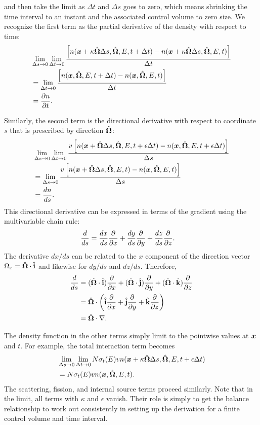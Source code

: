  and then take the limit as $\Delta t$ and $\Delta s$ goes to zero, which means shrinking the time interval to an instant and the associated control volume to zero size. We recognize the first term as the partial derivative of the density with respect to time: 
\begin{align}
  &\lim_{\Delta s \rightarrow 0} \lim_{\Delta t \rightarrow 0} \frac{ \left[ n( \bm{x} + \kappa \hat{\mathbf{\Omega}} \Delta s , \hat{\mathbf{\Omega}}, E, t + \Delta t ) - n( \bm{x} + \kappa \hat{\mathbf{\Omega}} \Delta s , \hat{\mathbf{\Omega}}, E, t ) \right] }{ \Delta t } \nonumber \\
  &= \lim_{\Delta t \rightarrow 0} \frac{ \left[ n( \bm{x} , \hat{\mathbf{\Omega}}, E, t + \Delta t ) - n( \bm{x} , \hat{\mathbf{\Omega}}, E, t ) \right] }{ \Delta t } \nonumber \\
  &= \frac{ \partial {n} }{ \partial {t} } .
\end{align} 

Similarly, the second term is the directional derivative with respect to coordinate $s$ that is prescribed by direction $\hat{\mathbf{\Omega}}$: 
\begin{align}
  &\lim_{\Delta s \rightarrow 0} \lim_{\Delta t \rightarrow 0} \frac{ v \left[ n( \bm{x} + \hat{\mathbf{\Omega}} \Delta s , \hat{\mathbf{\Omega}}, E, t + \epsilon \Delta t ) - n( \bm{x} , \hat{\mathbf{\Omega}}, E, t + \epsilon \Delta t ) \right] }{ \Delta s } \nonumber \\
  &= \lim_{\Delta s \rightarrow 0} \frac{ v \left[ n( \bm{x} + \hat{\mathbf{\Omega}} \Delta s , \hat{\mathbf{\Omega}}, E, t ) - n( \bm{x} , \hat{\mathbf{\Omega}}, E, t ) \right] }{ \Delta s } \nonumber \\
  &= \frac{dn}{ds} .
\end{align} 
This directional derivative can be expressed in terms of the gradient using the multivariable chain rule:
\begin{align}
  \frac{d}{ds} &= \frac{dx}{ds} \frac{ \partial {} }{ \partial {x} } + \frac{dy}{ds} \frac{ \partial {} }{ \partial {y} } + \frac{dz}{ds} \frac{ \partial {} }{ \partial {z} } .
\end{align}
The derivative $dx/ds$ can be related to the $x$ component of the direction vector $\Omega_x = \hat{\mathbf{\Omega}} \cdot \hat{\mathbf{i}}$ and likewise for $dy/ds$ and $dz/ds$. Therefore,
\begin{align}
  \frac{d}{ds} 
  &= ( \hat{\mathbf{\Omega}} \cdot \hat{\mathbf{i}} ) \frac{ \partial {} }{ \partial {x} } + ( \hat{\mathbf{\Omega}} \cdot \hat{\mathbf{j}} ) \frac{ \partial {} }{ \partial {y} } + ( \hat{\mathbf{\Omega}} \cdot \hat{\mathbf{k}} ) \frac{ \partial {} }{ \partial {z} } \nonumber \\
  &= \hat{\mathbf{\Omega}} \cdot \left( \hat{\mathbf{i}} \frac{ \partial {} }{ \partial {x} } + \hat{\mathbf{j}} \frac{ \partial {} }{ \partial {y} } + \hat{\mathbf{k}} \frac{ \partial {} }{ \partial {z} } \right) \nonumber \\
  &= \hat{\mathbf{\Omega}} \cdot \nabla .
\end{align}

The density function in the other terms simply limit to the pointwise values at $\bm{x}$ and $t$. For example, the total interaction term becomes
\begin{align}
  &\lim_{\Delta s \rightarrow 0} \lim_{\Delta t \rightarrow 0} N \sigma_t(E) v n( \bm{x} + \kappa \hat{\mathbf{\Omega}} \Delta s, \hat{\mathbf{\Omega}}, E, t + \epsilon \Delta t ) \nonumber \\
  &= N \sigma_t(E) v n( \bm{x} , \hat{\mathbf{\Omega}}, E, t ) .
\end{align}
The scattering, fission, and internal source terms proceed similarly. Note that in the limit, all terms with $\kappa$ and $\epsilon$ vanish. Their role is simply to get the balance relationship to work out consistently in setting up the derivation for a finite control volume and time interval.

